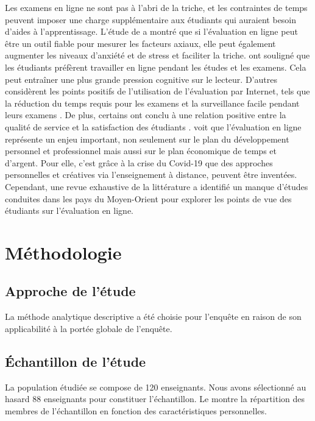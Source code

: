\documentclass[french]{textolivre}
\begin{document}
Les examens en ligne ne sont pas à l'abri de la triche, et les contraintes de temps peuvent imposer une charge supplémentaire aux étudiants qui auraient besoin d’aides à l'apprentissage. L'étude de \textcite{da2016attitude} a montré que si l'évaluation en ligne peut être un outil fiable pour mesurer les facteurs axiaux, elle peut également augmenter les niveaux d'anxiété et de stress et faciliter la triche. \textcite{eshet-alkalai_does_2007} ont souligné que les étudiants préfèrent travailler en ligne pendant les études et les examens. Cela peut entraîner une plus grande pression cognitive sur le lecteur. D'autres considèrent les points positifs de l'utilisation de l'évaluation par Internet, tels que la réduction du temps requis pour les examens et la surveillance facile pendant leurs examens \cite{abass2017development}. De plus, certains ont conclu à une relation positive entre la qualité de service et la satisfaction des étudiants \cite{abushamleh2021students}. \textcite{razika2022crise} voit que l’évaluation en ligne représente un enjeu important, non seulement sur le plan du développement personnel et professionnel mais aussi sur le plan économique de temps et d’argent. Pour elle, c’est grâce à la crise du Covid-19 que des approches personnelles et créatives via l’enseignement à distance, peuvent être inventées. Cependant, une revue exhaustive de la littérature a identifié un manque d'études conduites dans les pays du Moyen-Orient pour explorer les points de vue des étudiants sur l'évaluation en ligne.



\section{Méthodologie}

\subsection{Approche de l’étude}
La méthode analytique descriptive a été choisie pour l'enquête en raison de son applicabilité à la portée globale de l'enquête.


\subsection{Échantillon de l'étude}
La population étudiée se compose de 120 enseignants. Nous avons sélectionné au hasard 88 enseignants pour constituer l'échantillon. Le  montre la répartition des membres de l'échantillon en fonction des caractéristiques personnelles.
\end{document}
